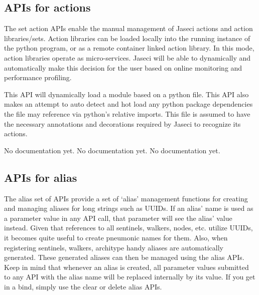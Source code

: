 \subsection{APIs for actions}

\par
The set action APIs enable the manual management of Jaseci actions and action
libraries/sets. Action libraries can be loaded locally into the running instance of
the python program, or as a remote container linked action library. In this mode,
action libraries operate as micro-services. Jaseci will be able to dynamically
and automatically make this decision for the user based on online monitoring and
performance profiling.

{This API will dynamically load a module based on a python file. This API also
makes an attempt to auto detect and hot load any python package dependencies
the file may reference via python's relative imports. This file is assumed to
have the necessary annotations and decorations required by Jaseci to recognize
its actions.\vspace{4mm}\par
{}}
{No documentation yet.}
{No documentation yet.}
{No documentation yet.}
\subsection{APIs for alias}

\par
The alias set of APIs provide a set of `alias' management functions for
creating and managing aliases for long strings such as UUIDs. If an alias'
name is used as a parameter value in any API call, that parameter will see
the alias' value instead. Given that references to all sentinels, walkers,
nodes, etc. utilize UUIDs, it becomes quite useful to create pneumonic
names for them. Also, when registering   sentinels, walkers, architype
handy aliases are automatically generated. These generated aliases can
then be managed using the alias APIs. Keep in mind that whenever an alias
is created, all parameter values submitted to any API with the alias name
will be replaced internally by its value. If you get in a bind, simply use
the clear or delete alias APIs.

